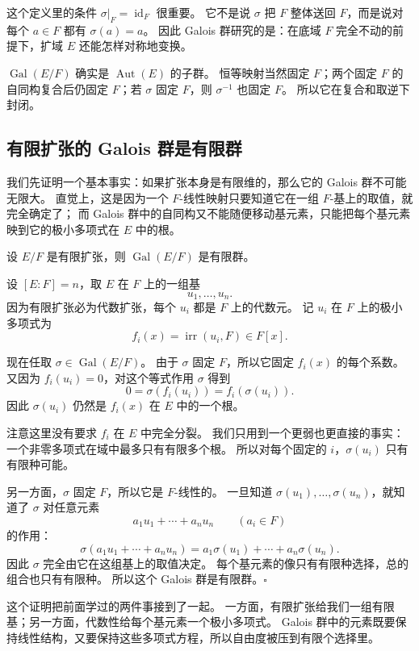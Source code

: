 这个定义里的条件 $\sigma|_F=\operatorname{id}_F$ 很重要。
它不是说 $\sigma$ 把 $F$ 整体送回 $F$，而是说对每个 $a\in F$ 都有 $\sigma(a)=a$。
因此 Galois 群研究的是：在底域 $F$ 完全不动的前提下，扩域 $E$ 还能怎样对称地变换。

$\operatorname{Gal}(E/F)$ 确实是 $\operatorname{Aut}(E)$ 的子群。
恒等映射当然固定 $F$；两个固定 $F$ 的自同构复合后仍固定 $F$；若 $\sigma$ 固定 $F$，则 $\sigma^{-1}$ 也固定 $F$。
所以它在复合和取逆下封闭。

\subsection{有限扩张的 Galois 群是有限群}

我们先证明一个基本事实：如果扩张本身是有限维的，那么它的 Galois 群不可能无限大。
直觉上，这是因为一个 $F$-线性映射只要知道它在一组 $F$-基上的取值，就完全确定了；
而 Galois 群中的自同构又不能随便移动基元素，只能把每个基元素映到它的极小多项式在 $E$ 中的根。

\begin{theorem}\label{thm:finite-extension-finite-galois-group}
设 $E/F$ 是有限扩张，则 $\operatorname{Gal}(E/F)$ 是有限群。
\end{theorem}

设 $[E:F]=n$，取 $E$ 在 $F$ 上的一组基
\[
u_1,\ldots,u_n.
\]
因为有限扩张必为代数扩张，每个 $u_i$ 都是 $F$ 上的代数元。
记 $u_i$ 在 $F$ 上的极小多项式为
\[
f_i(x)=\operatorname{irr}(u_i,F)\in F[x].
\]

现在任取 $\sigma\in\operatorname{Gal}(E/F)$。
由于 $\sigma$ 固定 $F$，所以它固定 $f_i(x)$ 的每个系数。
又因为 $f_i(u_i)=0$，对这个等式作用 $\sigma$ 得到
\[
0=\sigma(f_i(u_i))=f_i(\sigma(u_i)).
\]
因此 $\sigma(u_i)$ 仍然是 $f_i(x)$ 在 $E$ 中的一个根。

注意这里没有要求 $f_i$ 在 $E$ 中完全分裂。
我们只用到一个更弱也更直接的事实：一个非零多项式在域中最多只有有限多个根。
所以对每个固定的 $i$，$\sigma(u_i)$ 只有有限种可能。

另一方面，$\sigma$ 固定 $F$，所以它是 $F$-线性的。
一旦知道 $\sigma(u_1),\ldots,\sigma(u_n)$，就知道了 $\sigma$ 对任意元素
\[
a_1u_1+\cdots+a_nu_n\qquad (a_i\in F)
\]
的作用：
\[
\sigma(a_1u_1+\cdots+a_nu_n)
=a_1\sigma(u_1)+\cdots+a_n\sigma(u_n).
\]
因此 $\sigma$ 完全由它在这组基上的取值决定。
每个基元素的像只有有限种选择，总的组合也只有有限种。
所以这个 Galois 群是有限群。$\square$

这个证明把前面学过的两件事接到了一起。
一方面，有限扩张给我们一组有限基；另一方面，代数性给每个基元素一个极小多项式。
Galois 群中的元素既要保持线性结构，又要保持这些多项式方程，所以自由度被压到有限个选择里。

